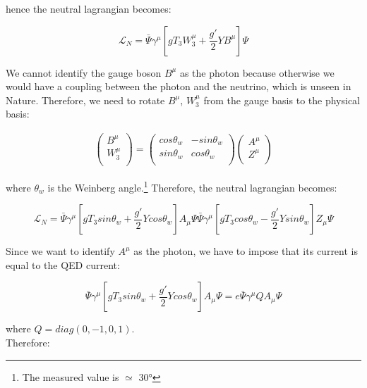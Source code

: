 hence the neutral lagrangian becomes:

\begin{equation}
    \mathcal{L}_N = \bar{\Psi} \gamma^{\mu} [gT_3W_3^{\mu} + \frac{g'}{2} Y B^{\mu}] \Psi
\end{equation}

We cannot identify the gauge boson $B^{\mu}$ as the photon because otherwise we would have a coupling between the photon and the
neutrino, which is unseen in Nature.
Therefore, we need to rotate $B^{\mu}$, $W_3^{\mu}$ from the gauge basis to the physical basis:

\begin{align}
    \begin{pmatrix}
        B^{\mu}\\
        W_3^{\mu} \\
    \end{pmatrix}
    =
    \begin{pmatrix}
        cos\theta_w & - sin\theta_w\\
        sin\theta_w &  cos\theta_w\\
    \end{pmatrix}
    \begin{pmatrix}
        A^{\mu}\\
        Z^{\mu} \\
    \end{pmatrix}
\end{align}

where $\theta_w$ is the Weinberg angle.\footnote[1]{The measured value is $\simeq$ $\ang{30}$}
Therefore, the neutral lagrangian becomes:

\begin{equation}
    \mathcal{L}_N = \bar{\Psi} \gamma^{\mu}[gT_3 sin\theta_w + \frac{g'}{2}Ycos\theta_w] A_{\mu}\Psi
    \bar{\Psi} \gamma^{\mu} [gT_3cos\theta_w - \frac{g'}{2}Ysin\theta_w] Z_{\mu} \Psi
\end{equation}

Since we want to identify $A^{\mu}$ as the photon, we have to impose that its current is equal to the
QED current:

\begin{equation}
    \bar{\Psi} \gamma^{\mu}[gT_3 sin\theta_w + \frac{g'}{2}Ycos\theta_w] A_{\mu}\Psi = e \bar{\Psi} \gamma^{\mu} Q A_{\mu}\Psi
\end{equation}

where $Q = diag(0, -1, 0, 1)$.\\
Therefore:

